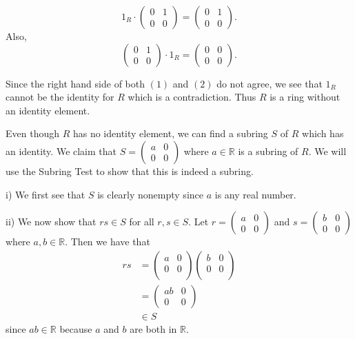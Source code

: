 \documentclass{article}
\begin{document}
\begin{equation}
	1_R \cdot 
	\begin{pmatrix}
		0 & 1 \\
		0 & 0
	\end{pmatrix} =
	\begin{pmatrix}
		0 & 1\\
		0 & 0
	\end{pmatrix}.
\end{equation}
Also,
\begin{equation}
	\begin{pmatrix}
	0 & 1 \\
	0 & 0
	\end{pmatrix}
	\cdot 1_R =
	\begin{pmatrix}
	0 & 0\\
	0 & 0
	\end{pmatrix}.
\end{equation}

Since the right hand side of both $(1)$ and $(2)$ do not agree, we see that $1_R$ cannot be the identity for $R$ which is a contradiction. Thus $R$ is a ring without an identity element.

Even though $R$ has no identity element, we can find a subring $S$ of $R$ which has an identity. We claim that $S =
\begin{pmatrix}
	a & 0 \\
	0 & 0
\end{pmatrix}$ where $a \in \mathbb{R}$ is a subring of $R$. We will use the Subring Test to show that this is indeed a subring.

i) We first see that $S$ is clearly nonempty since $a$ is any real number.

ii) We now show that $rs \in S$ for all $r, s \in S$. Let $r = 
\begin{pmatrix}
	a & 0 \\
	0 & 0
\end{pmatrix}$ and $s =
\begin{pmatrix}
	b & 0 \\
	0 & 0
\end{pmatrix}$ where $a, b \in \mathbb{R}$. Then we have that 
\begin{align*}
	rs &= 
	\begin{pmatrix}
		a & 0 \\
		0 & 0 \\
	\end{pmatrix}
	\begin{pmatrix}
		b & 0 \\
		0 & 0 \\
	\end{pmatrix} \\
	&= \begin{pmatrix}
		ab & 0 \\
		0 & 0
	\end{pmatrix} \\
	& \in S
\end{align*} since $ab \in \mathbb{R}$ because $a$ and $b$ are both in $\mathbb{R}$. 
\end{document}
